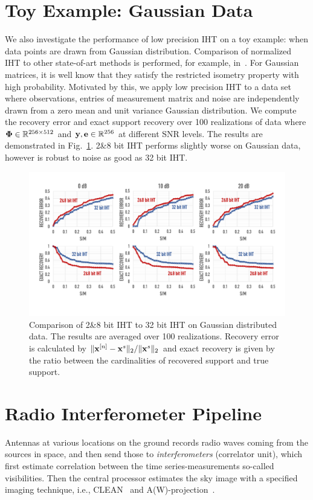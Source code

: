 \documentclass{article}
\begin{document}
\section{Toy Example: Gaussian Data}
We also investigate the performance of low precision IHT on a toy example: when data points are drawn from Gaussian distribution. Comparison of normalized IHT to other state-of-art methods is performed, for example, in~\cite{blumensath2010niht, blumensath2012greedy}. For Gaussian matrices, it is well know that they satisfy the restricted isometry property with high probability. Motivated by this, we apply low precision IHT to a data set where observations, entries of measurement matrix and noise are independently drawn from a zero mean and unit variance Gaussian distribution. We compute the recovery error and exact support recovery over 100 realizations of data where ${\bf \Phi} \in \mathbb{R}^{256\times 512}$ and ${\bf y}, {\bf e} \in \mathbb{R}^{256}$ at different SNR levels. The results are demonstrated in Fig.~\ref{fig:iht_on_gaussian}. 2\&8 bit IHT performs slightly worse on Gaussian data, however is robust to noise as good as 32 bit IHT.
\begin{figure}[t]
\centering
\includegraphics[width=1\columnwidth, angle=0]{figs/iht_on_gaussian.pdf}
\caption{Comparison of 2\&8 bit IHT to 32 bit IHT on Gaussian distributed data. The results are averaged over 100 realizations. Recovery error is calculated by $\| {\bf x}^{[n]} -{\bf x}^s \|_2/\|{\bf x}^s \|_2$ and exact recovery is given by the ratio between the cardinalities of recovered support and true support.}
\label{fig:iht_on_gaussian}
\vspace{-1em}
\end{figure}

\section{Radio Interferometer Pipeline}\label{sec:astronomy}
Antennas at various locations on the ground records radio waves coming from the sources in space, and then send those to {\it interferometers} (correlator unit), which first estimate correlation between the time series-measurements so-called visibilities. Then the central processor estimates the sky image with a specified imaging technique, i.e., {CLEAN}~\cite{hogbom1974clean} and A(W)-projection~\cite{bhatganar2008ra}. 
\end{document}
